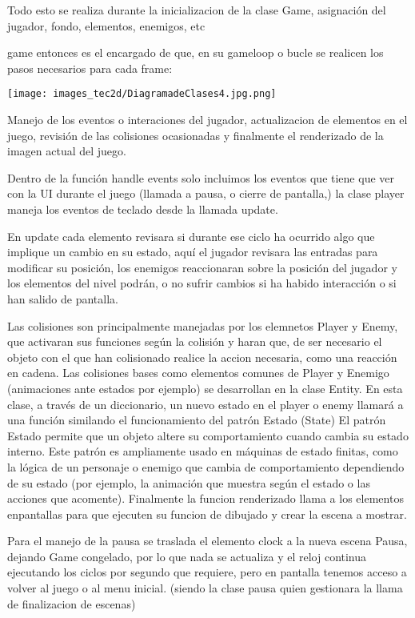 \documentclass[12pt,a4paper,twoside,spanish]{article}      %
\begin{document}
 
Todo esto se realiza durante la inicializacion de la clase Game, asignación del jugador, fondo, elementos, enemigos, etc

game entonces es el encargado de que, en su gameloop o bucle se realicen los pasos necesarios para cada frame:

\begin{center}
    \texttt{[image: images\_tec2d/DiagramadeClases4.jpg.png]}
\end{center}

Manejo de los eventos o interaciones del jugador, actualizacion de elementos en el juego, revisión de las colisiones ocasionadas y finalmente el renderizado de la imagen actual del juego.

Dentro de la función handle events solo incluimos los eventos que tiene que ver con la UI durante el juego (llamada a pausa, o cierre de pantalla,) la clase player maneja los eventos de teclado desde la llamada update.

En update cada elemento revisara si durante ese ciclo ha ocurrido algo que implique un cambio en su estado, aquí el jugador revisara las entradas para modificar su posición, los enemigos reaccionaran sobre la posición del jugador y los elementos del nivel podrán, o no sufrir cambios si ha habido interacción o si han salido de pantalla.

Las colisiones son principalmente manejadas por los elemnetos Player y Enemy, que activaran sus funciones según la colisión y haran que, de ser necesario el objeto con el que han colisionado realice la accion necesaria, como una reacción en cadena.
Las colisiones bases como elementos comunes de Player y Enemigo (animaciones ante estados por ejemplo) se desarrollan en la clase Entity. 
En esta clase, a través de un diccionario, un nuevo estado en el player o enemy llamará a una función similando el funcionamiento del patrón Estado (State)
El patrón Estado permite que un objeto altere su comportamiento cuando cambia su estado interno. 
Este patrón es ampliamente usado en máquinas de estado finitas, como la lógica de un personaje o enemigo que cambia de comportamiento dependiendo de su estado (por ejemplo, la animación que muestra según el estado o las acciones que acomente).
Finalmente la funcion renderizado llama a los elementos enpantallas para que ejecuten su funcion de dibujado y crear la escena a mostrar.

Para el manejo de la pausa se traslada el elemento clock a la nueva escena Pausa, dejando Game congelado, por lo que nada se actualiza y el reloj continua ejecutando los ciclos por segundo que requiere, pero en pantalla tenemos acceso a volver al juego o al menu inicial. (siendo la clase pausa quien gestionara la llama de finalizacion de escenas)
\end{document}
